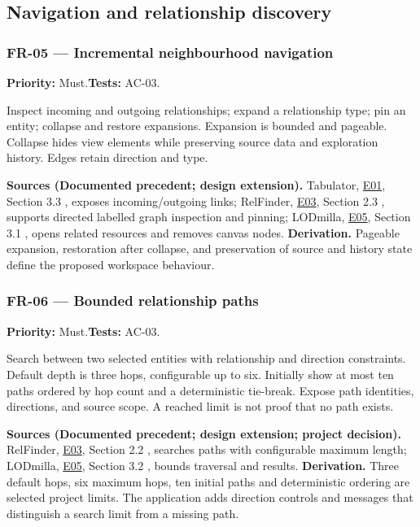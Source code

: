 \documentclass[11pt,a4paper]{article}
\newcommand{\req}[4]{\subsubsection*{#1 --- #2}\phantomsection\label{req:#1}\textbf{Priority:} #3.\quad\textbf{Tests:} #4.\par}
\newcommand{\origin}[3]{\par{\small\textbf{Sources (#1).} #2 \textbf{Derivation.} #3\par}}
\newcommand{\evidence}[1]{\hyperlink{evidence:#1}{#1}}
\begin{document}
\subsection{Navigation and relationship discovery}
\par\noindent\begin{minipage}{\linewidth}
\req{FR-05}{Incremental neighbourhood navigation}{Must}{AC-03}
Inspect incoming and outgoing relationships; expand a relationship type; pin an entity; collapse and restore expansions. Expansion is bounded and pageable. Collapse hides view elements while preserving source data and exploration history. Edges retain direction and type.
\origin{Documented precedent; design extension}{Tabulator, \evidence{E01}, Section 3.3 \citep{tabulator}, exposes incoming/outgoing links; RelFinder, \evidence{E03}, Section 2.3 \citep{relfinder}, supports directed labelled graph inspection and pinning; LODmilla, \evidence{E05}, Section 3.1 \citep{lodmilla}, opens related resources and removes canvas nodes.}{Pageable expansion, restoration after collapse, and preservation of source and history state define the proposed workspace behaviour.}
\end{minipage}\par
\par\noindent\begin{minipage}{\linewidth}
\req{FR-06}{Bounded relationship paths}{Must}{AC-03}
Search between two selected entities with relationship and direction constraints. Default depth is three hops, configurable up to six. Initially show at most ten paths ordered by hop count and a deterministic tie-break. Expose path identities, directions, and source scope. A reached limit is not proof that no path exists.
\origin{Documented precedent; design extension; project decision}{RelFinder, \evidence{E03}, Section 2.2 \citep{relfinder}, searches paths with configurable maximum length; LODmilla, \evidence{E05}, Section 3.2 \citep{lodmilla}, bounds traversal and results.}{Three default hops, six maximum hops, ten initial paths and deterministic ordering are selected project limits. The application adds direction controls and messages that distinguish a search limit from a missing path.}
\end{minipage}\par
\end{document}
